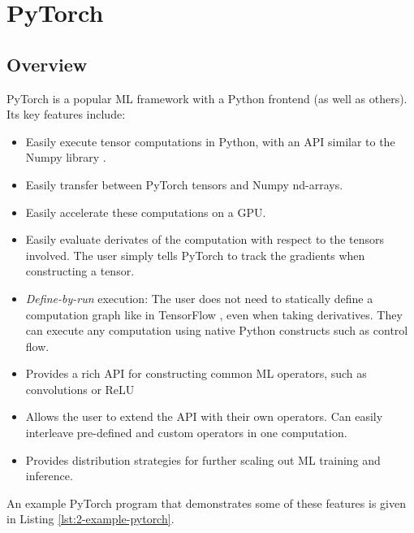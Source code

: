 \section{PyTorch}
\subsection{Overview}
PyTorch \cite{Paszke2017} is a popular ML framework with a Python frontend (as well as others).
Its key features include:
\begin{itemize}[topsep=0.2em, parsep=0.5\parskip]
    \item Easily execute tensor computations in Python, with an API similar to the Numpy library \cite{VanDerWalt2011}.
    \item Easily transfer between PyTorch tensors and Numpy nd-arrays.
    \item Easily accelerate these computations on a GPU.
    \item Easily evaluate derivates of the computation with respect to the tensors involved.
    The user simply tells PyTorch to track the gradients when constructing a tensor.
    \item \textit{Define-by-run} execution: The user does not need to statically define a computation graph like in TensorFlow \cite{tensorflow2015-whitepaper}, even when taking derivatives.
    They can execute any computation using native Python constructs such as control flow.
    \item Provides a rich API for constructing common ML operators, such as convolutions or ReLU
    \item Allows the user to extend the API with their own operators.
    Can easily interleave pre-defined and custom operators in one computation.
    \item Provides distribution strategies for further scaling out ML training and inference.
\end{itemize}

An example PyTorch program that demonstrates some of these features is given in Listing \ref{lst:2-example-pytorch}.

\vfill


